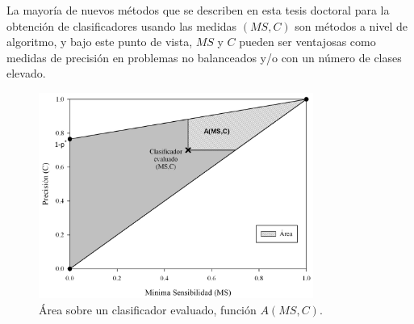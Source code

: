 La mayoría de nuevos métodos que se describen en esta tesis doctoral para la obtención de
clasificadores usando las medidas $(MS,C)$ son métodos a nivel de algoritmo, y bajo este
punto
de vista, $MS$ y $C$ pueden ser ventajosas como medidas de precisión en problemas no
balanceados y/o con un número de clases elevado.
\newpage

\begin{figure}[!htp]
\centering
\includegraphics[keepaspectratio,width=9cm]{figuras/EA.jpg}
\caption{Área sobre un clasificador evaluado, función $A(MS,C)$.}
\label{regionFactibleAreaEA}
\end{figure}
\paginavaciacompleta